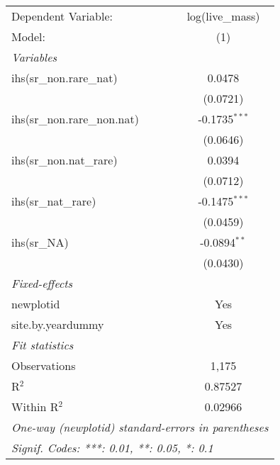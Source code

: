 \begin{tabular}{lc}
\tabularnewline\midrule\midrule
Dependent Variable:&log(live\_mass)\\
Model:&(1)\\
\midrule \emph{Variables}&  \\
ihs(sr\_non.rare\_nat)&0.0478\\
  &(0.0721)\\
ihs(sr\_non.rare\_non.nat)&-0.1735$^{***}$\\
  &(0.0646)\\
ihs(sr\_non.nat\_rare)&0.0394\\
  &(0.0712)\\
ihs(sr\_nat\_rare)&-0.1475$^{***}$\\
  &(0.0459)\\
ihs(sr\_NA)&-0.0894$^{**}$\\
  &(0.0430)\\
\midrule \emph{Fixed-effects}&  \\
newplotid & Yes\\
site.by.yeardummy & Yes\\
\midrule \emph{Fit statistics}&  \\
Observations & 1,175\\
R$^2$ & 0.87527\\
Within R$^2$ & 0.02966\\
\midrule\midrule\multicolumn{2}{l}{\emph{One-way (newplotid) standard-errors in parentheses}}\\
\multicolumn{2}{l}{\emph{Signif. Codes: ***: 0.01, **: 0.05, *: 0.1}}\\
\end{tabular}



